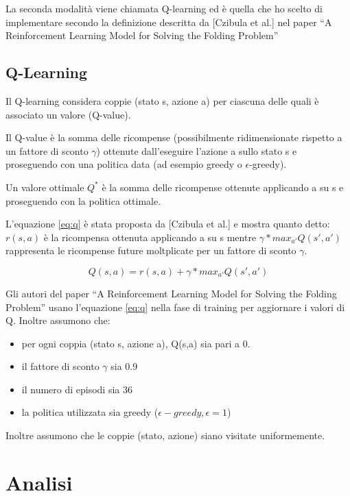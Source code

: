 \documentclass[conference]{IEEEtran}
\begin{document}
La seconda modalità viene chiamata Q-learning ed è quella che ho scelto di implementare secondo la definizione descritta da [Czibula et al.] nel paper ``A Reinforcement Learning Model for Solving the Folding Problem''

\subsection{Q-Learning}

Il Q-learning considera coppie (stato s, azione a) per ciascuna delle quali è associato un valore (Q-value).

Il Q-value è la somma delle ricompense (possibilmente ridimensionate rispetto a un fattore di sconto $\gamma$) ottenute dall'eseguire l'azione a sullo stato s e proseguendo con una politica data (ad esempio greedy o $\epsilon$-greedy).

Un valore ottimale $Q^*$ è la somma delle ricompense ottenute applicando a su s e proseguendo con la politica ottimale.

L'equazione \ref{eq:q} è stata proposta da [Czibula et al.] e mostra quanto detto: $r(s,a)$ è la ricompensa ottenuta applicando a su s mentre $\gamma * max_{a'} Q(s', a')$ rappresenta le ricompense future moltplicate per un fattore di sconto $\gamma$.

\begin{equation}
\label{eq:q}
Q(s,a) = r(s,a) + \gamma * max_{a'} Q(s', a')
\end{equation}

Gli autori del paper ``A Reinforcement Learning Model for Solving the Folding Problem'' usano l'equazione \ref{eq:q} nella fase di training per aggiornare i valori di Q. Inoltre assumono che:

\begin{itemize}
 \item per ogni coppia (stato s, azione a), Q(s,a) sia pari a 0.
 \item il fattore di sconto $\gamma$ sia 0.9
 \item il numero di episodi sia 36
 \item la politica utilizzata sia greedy ($\epsilon-greedy, \epsilon = 1$)
\end{itemize}

Inoltre assumono che le coppie (stato, azione) siano visitate uniformemente.

\section{Analisi}
\end{document}
